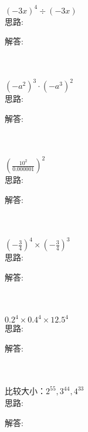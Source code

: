 \item {
    $ (-3x)^{4}\div (-3x) $
    \ifshowSolution
        \fangsong{}
        \\
        思路:

        解答: 
    \else
        \\ \\ \\
    \fi
}

\item {
    $ (-a^2)^{3}\cdot (-a^3)^2 $
    \ifshowSolution
        \fangsong{}
        \\
        思路:

        解答: 
    \else
        \\ \\ \\
    \fi
}

\item {
    $ (\frac{10^2}{0.000001})^{2} $
    \ifshowSolution
        \fangsong{}
        \\
        思路:

        解答: 
    \else
        \\ \\ \\
    \fi
}

\item {
    $ (-\frac{3}{4})^4\times (-\frac{3}{4})^3 $
    \ifshowSolution
        \fangsong{}
        \\
        思路:

        解答: 
    \else
        \\ \\ \\
    \fi
}

\item {
    $ 0.2^4\times 0.4^4 \times 12.5^4 $
    \ifshowSolution
        \fangsong{}
        \\
        思路:

        解答: 
    \else
        \\ \\ \\
    \fi
}

\item {
    比较大小：$ 2^{55}, 3^{44}, 4^{33} $
    \ifshowSolution
        \fangsong{}
        \\
        思路:

        解答: 
    \else
        \\ \\ \\
    \fi
}

